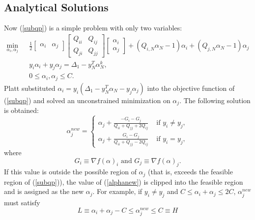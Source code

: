 \documentclass[11pt]{article}
\theoremstyle{break}
\begin{document}
\subsection{Analytical Solutions}
Now (\ref{subqp}) is a simple problem
with only two variables:
\begin{eqnarray}
 \min_{\alpha_i, \alpha_j} & & \frac{1}{2}
\begin{bmatrix}
\alpha_{i} & 
\alpha_{j}
\end{bmatrix}
\begin{bmatrix}
Q_{ii} & Q_{ij} \\
Q_{ji} & Q_{jj} 
\end{bmatrix}
\begin{bmatrix}
\alpha_i \\
\alpha_j 
\end{bmatrix} 
+ 
(Q_{i,N}\alpha_N -1)
\alpha_i
+
(Q_{j,N}\alpha_N -1)
\alpha_j
\nonumber \\
&& 
y_i \alpha_i
+ 
y_j \alpha_j  
= \Delta_1 - y_N^T \alpha_N^k, 
\label{2varqp} \\
&& 0 \leq 
\alpha_i, 
\alpha_j 
 \leq C. \nonumber 
\end{eqnarray}
Platt  
\citeyear{JP98a} substituted 
$\alpha_{i}
= y_{i} 
(\Delta_1 -y_N^T \alpha_N 
- y_{j} \alpha_{j})$
into the objective function
of (\ref{subqp}) and solved
an unconstrained 
minimization on 
$\alpha_{j}$.
The following solution is 
obtained:
\begin{equation}
\label{alphanew}
\alpha_{j}^{new}
= 
\begin{cases}
\alpha_{j} + 
\frac{- G_i
-G_j}
{Q_{i i}+Q_{j j}+
2Q_{i j}}
& \mbox{ if } y_{i} \neq
y_{j}, \\
\alpha_{j} + 
\frac{
G_i - G_j
}
{Q_{i i}+Q_{j j}-
2Q_{i j}}
& \mbox{ if } y_{i} =
y_{j},
\end{cases}
\end{equation}
where 
\begin{equation*}
  G_i \equiv \nabla f(\alpha)_i 
\mbox{ and }
  G_j \equiv \nabla f(\alpha)_j.
\end{equation*}
If this value is outside
the possible region
of $\alpha_{j}$
(that is, exceeds the feasible
region of (\ref{subqp})), 
the value of (\ref{alphanew})
is clipped into the feasible
region and is assigned as the new 
$\alpha_{j}$.
For example, if 
$y_i \neq y_j$
and 
$C \leq \alpha_i + 
\alpha_j \leq 2C$,
$\alpha_j^{new}$ must satisfy
\begin{equation*}
L 
\equiv
\alpha_i + \alpha_j
- C \leq
\alpha_j^{new} 
\leq C \equiv H  
\end{equation*}
\end{document}
